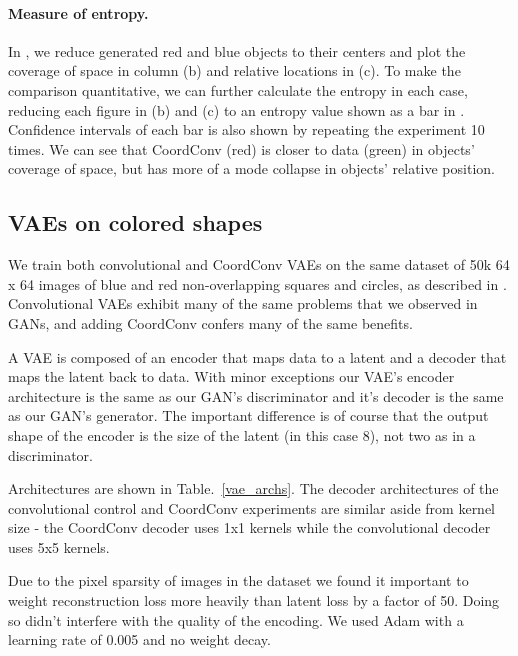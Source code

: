 \documentclass{article}
\begin{document}

\paragraph{Measure of entropy.}  
In , we reduce generated red and blue objects to their centers and plot the coverage of space in column (b) and relative locations in (c). To make the comparison quantitative, we can further calculate the entropy in each case, reducing each figure in (b) and (c) to an entropy value shown as a bar in . Confidence intervals of each bar is also shown by repeating the experiment 10 times. We can see that CoordConv (red) is closer to data (green) in objects' coverage of space, but has more of a mode collapse in objects' relative position.


\subsection{VAEs on colored shapes}

We train both convolutional and CoordConv VAEs on the same dataset of 50k 64 x 64 images of blue and red non-overlapping squares and circles, as described in .
Convolutional VAEs exhibit many of the same problems that we observed in GANs, and adding CoordConv confers many of the same benefits.



A VAE is composed of an encoder that maps data to a latent and a decoder that maps the latent back to data. With minor exceptions our VAE's encoder architecture is the same as our GAN's discriminator and it's decoder is the same as our GAN's generator. The important difference is of course that the output shape of the encoder is the size of the latent (in this case 8), not two as in a discriminator.

Architectures are shown in Table.~\ref{vae_archs}. The decoder architectures of the convolutional control and CoordConv experiments are similar aside from kernel size - the CoordConv decoder uses 1x1 kernels while the convolutional decoder uses 5x5 kernels. 

Due to the pixel sparsity of images in the dataset we found it important to weight reconstruction loss more heavily than latent loss by a factor of 50. Doing so didn't interfere with the quality of the encoding. We used Adam with a learning rate of 0.005 and no weight decay.
\end{document}
